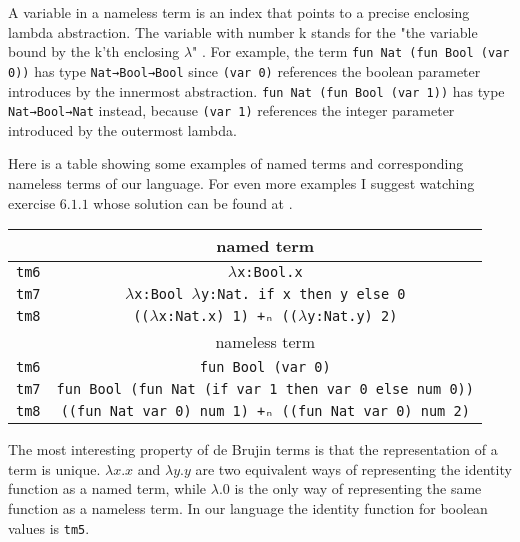 \documentclass{article}
\begin{document}
A variable in a nameless term is an index that points to a precise enclosing lambda abstraction.
The variable with number k stands for the "the variable bound by the k'th enclosing $\lambda$" \cite[Ch.\ 6 p.\ 76]{pierce}.
For example, the term \texttt{fun Nat (fun Bool (var 0))} has type \texttt{Nat→Bool→Bool} since \texttt{(var 0)} references the boolean parameter introduces by the innermost abstraction.
\texttt{fun Nat (fun Bool (var 1))} has type \texttt{Nat→Bool→Nat} instead, because \texttt{(var 1)} references the integer parameter introduced by the outermost lambda.

Here is a table showing some examples of named terms and corresponding nameless terms of our language.
For even more examples I suggest watching exercise $6.1.1$ \cite[p.\ 76]{pierce} whose solution can be found at \cite[p.\ 503]{pierce}.

\begin{center}
\begin{tabular}{ |c|c| } 
 \hline
 & named term \\
 \hline
 \texttt{tm6} & \texttt{$\lambda$x:Bool.x} \\
 \texttt{tm7} & \texttt{$\lambda$x:Bool $\lambda$y:Nat. if x then y else 0} \\
 \texttt{tm8} & \texttt{(($\lambda$x:Nat.x) 1) +ₙ (($\lambda$y:Nat.y) 2)} \\
 \hline
 \hline
 
 & nameless term \\
 \hline
 \texttt{tm6} & \texttt{fun Bool (var 0)} \\
 \texttt{tm7} & \texttt{fun Bool (fun Nat (if var 1 then var 0 else num 0))} \\
 \texttt{tm8} & \texttt{((fun Nat var 0) num 1) +ₙ ((fun Nat var 0) num 2)} \\
 
 \hline
\end{tabular}
\end{center}

The most interesting property of de Brujin terms is that the representation of a term is unique.
$\lambda x.x$ and $\lambda y.y$ are two equivalent ways of representing the identity function as a named term, while $\lambda.0$ is the only way of representing the same function as a nameless term.
In our language the identity function for boolean values is \texttt{tm5}.


\newpage
\nocite{*}
\printbibliography
\end{document}
